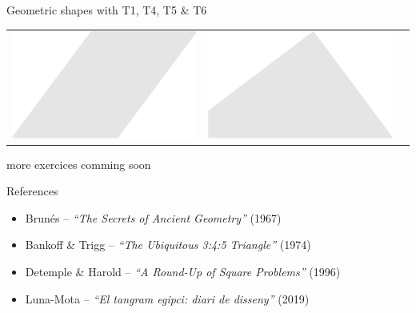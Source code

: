 \documentclass[14pt]{beamer}
\begin{document}
\begin{frame}{Geometric shapes with T1, T4, T5 \& T6}
\begin{center}
\begin{tabular}{ccc}
                \;\;\includegraphics[scale=0.3]{figures/figure023g.pdf} \;\;&
                \;\;\includegraphics[scale=0.3]{figures/figure023i.pdf} \\
            \end{tabular}
        \end{center}
    \end{frame}


    \begin{frame}{}
        \begin{center}
            more exercices comming soon
        \end{center}
    \end{frame}


    \begin{frame}{References}
        {\footnotesize
        \begin{itemize}        
            \item Brunés -- \emph{``The Secrets of Ancient Geometry''} (1967)
            \item Bankoff \& Trigg -- \emph{``The Ubiquitous 3:4:5 Triangle''} (1974)
            \item Detemple \& Harold -- \emph{``A Round-Up of Square Problems''} (1996)
            \item Luna-Mota -- \emph{``El tangram egipci: diari de disseny''}  (2019)
        \end{itemize}}
    \end{frame}

\end{document}
